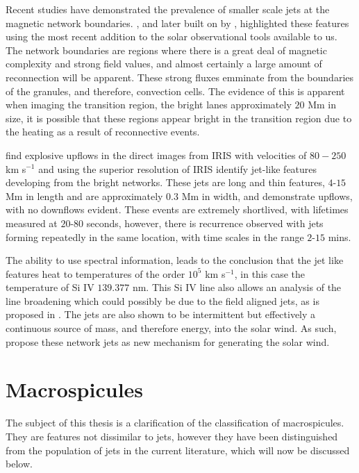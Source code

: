 Recent studies have demonstrated the prevalence of smaller scale jets at the magnetic network boundaries.
\cite{Tian2014}, and later built on by \cite{Narang2016}, highlighted these features using the most recent addition to the solar observational tools available to us.
The network boundaries are regions where there is a great deal of magnetic complexity and strong field values, and almost certainly a large amount of reconnection will be apparent.
These strong fluxes emminate from the boundaries of the granules, and therefore, convection cells.
The evidence of this is apparent when imaging the transition region, the bright lanes approximately $20$ Mm in size, it is possible that these regions appear bright in the transition region due to the heating as a result of reconnective events. 

\cite{Narang2016} find explosive upflows in the direct images from IRIS with velocities of $80-250$ km s$^{-1}$ and using the superior resolution of IRIS identify jet-like features developing from the bright networks.
These jets are long and thin features, $4$-$15$ Mm in length and are approximately $0.3$ Mm in width, and demonstrate upflows, with no downflows evident.
These events are extremely shortlived, with lifetimes measured at $20$-$80$ seconds, however, there is recurrence observed with jets forming repeatedly in the same location, with time scales in the range $2$-$15$ mins.

The ability to use spectral information, leads \cite{Narang2016} to the conclusion that the jet like features heat to temperatures of the order $10^5$ km s$^{-1}$, in this case the temperature of Si IV $139.377$ nm.
This Si IV line also allows an analysis of the line broadening which could possibly be due to the field aligned jets, as is proposed in \cite{Archontis2005}.
The jets are also shown to be intermittent but effectively a continuous source of mass, and therefore energy, into the solar wind.
As such, \cite{Narang2016} propose these network jets as new mechanism for generating the solar wind.



\section{Macrospicules}
\label{sec:MS}

The subject of this thesis is a clarification of the classification of macrospicules. 
They are features not dissimilar to jets, however they have been distinguished from the population of jets in the current literature, which will now be discussed below.

